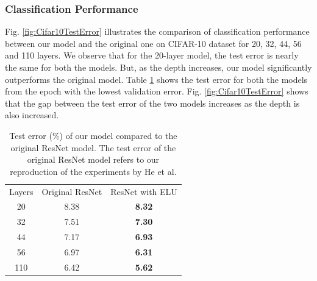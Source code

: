 \documentclass[10pt,twocolumn,letterpaper]{article}
\begin{document}
\subsubsection{Classification Performance}

Fig. \ref{fig:Cifar10TestError} illustrates the comparison of classification performance between our model and the original one on CIFAR-10 dataset for 20, 32, 44, 56 and 110 layers. We observe that for the 20-layer model, the test error is nearly the same for both the models. But, as the depth increases, our model significantly outperforms the original model. Table \ref{table:Cifar10TestErrorTable} shows the test error for both the models from the epoch with the lowest validation error. Fig. \ref{fig:Cifar10TestError} shows that the gap between the test error of the two models increases as the depth is also increased.

\setlength{\tabcolsep}{4pt}
\begin{table}
    \centering
    \caption{Test error (\%) of our model compared to the original ResNet model. The test error of the original ResNet model refers to our reproduction of the experiments by  He et al. \cite{[1]}}
    \label{table:Cifar10TestErrorTable}
    \begin{tabular}{c c c}
        \hline \noalign{\smallskip}
        Layers & Original ResNet & ResNet with ELU \\
        \noalign{\smallskip}
        \hline
        \noalign{\smallskip}
        20 & 8.38 & \textbf{8.32}\\
        32 & 7.51 & \textbf{7.30}\\
        44 & 7.17 & \textbf{6.93}\\
        56 & 6.97 & \textbf{6.31}\\
        110 & 6.42 & \textbf{5.62}\\
        \hline
    \end{tabular}
\end{table}
\end{document}
